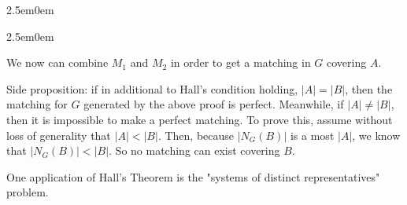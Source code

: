 \documentclass{book}
\newenvironment{myIndent}{%
   \begin{adjustwidth}{2.5em}{0em}%
}{%
   \end{adjustwidth}%
}
\newcommand{\retTwo}{\hfill\bigbreak}
\begin{document}
{\begin{myIndent}
{\begin{myIndent}
\begin{itemize}
{            We now can combine $M_1$ and $M_2$ in order to get a matching in $G$ covering $A$.
         }
      \end{itemize}
      \end{myIndent}}
      \retTwo
      Side proposition: if in additional to Hall's condition holding, $\lvert A \rvert = \lvert B \rvert$, then the matching for $G$ generated by the above proof is perfect. Meanwhile, if $\lvert A \rvert \neq \lvert B \rvert$, then it is impossible to make a perfect matching. To prove this, assume without loss of generality that $\lvert A \rvert < \lvert B \rvert$. Then, because $\left| N_G(B) \right|$ is a most $\left| A \right|$, we know that $\left| N_G(B) \right| < \left| B \right|$. So no matching can exist covering $B$.
\end{myIndent}}

\newpage

One application of Hall's Theorem is the "systems of distinct representatives"\\ problem.
\end{document}
